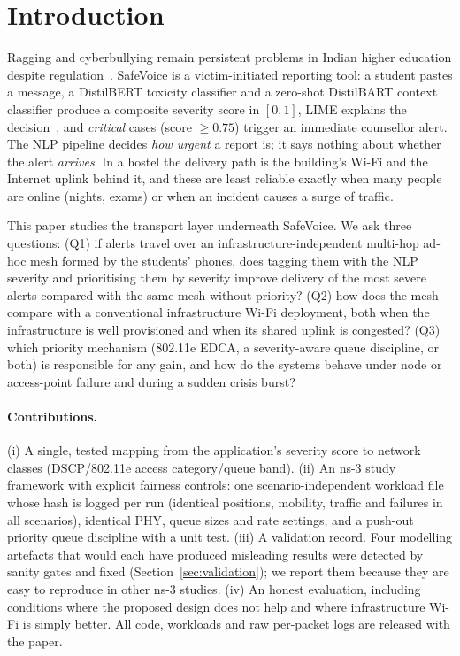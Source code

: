 \section{Introduction}
Ragging and cyberbullying remain persistent problems in Indian higher education despite regulation~\cite{ugc2009}.
SafeVoice is a victim-initiated reporting tool: a student pastes a message, a DistilBERT toxicity classifier and a zero-shot
DistilBART context classifier produce a composite severity score in $[0,1]$, LIME explains the decision~\cite{ribeiro2016,sanh2019},
and \emph{critical} cases (score $\ge 0.75$) trigger an immediate counsellor alert.
The NLP pipeline decides \emph{how urgent} a report is; it says nothing about whether the alert \emph{arrives}.
In a hostel the delivery path is the building's Wi-Fi and the Internet uplink behind it, and these are least reliable exactly when many
people are online (nights, exams) or when an incident causes a surge of traffic.

This paper studies the transport layer underneath SafeVoice. We ask three questions:
(Q1) if alerts travel over an infrastructure-independent multi-hop ad-hoc mesh formed by the students' phones, does tagging them with
the NLP severity and prioritising them by severity improve delivery of the most severe alerts compared with the same mesh without priority?
(Q2) how does the mesh compare with a conventional infrastructure Wi-Fi deployment, both when the infrastructure is well provisioned
and when its shared uplink is congested? (Q3) which priority mechanism (802.11e EDCA, a severity-aware queue discipline, or both) is responsible
for any gain, and how do the systems behave under node or access-point failure and during a sudden crisis burst?

\paragraph{Contributions.}
(i) A single, tested mapping from the application's severity score to network classes (DSCP/802.11e access category/queue band).
(ii) An ns-3 study framework with explicit fairness controls: one scenario-independent workload file whose hash is logged per run
(identical positions, mobility, traffic and failures in all scenarios), identical PHY, queue sizes and rate settings, and a push-out
priority queue discipline with a unit test.
(iii) A validation record. Four modelling artefacts that would each have produced misleading results were detected by sanity gates and fixed
(Section~\ref{sec:validation}); we report them because they are easy to reproduce in other ns-3 studies.
(iv) An honest evaluation, including conditions where the proposed design does not help and where infrastructure Wi-Fi is simply better.
All code, workloads and raw per-packet logs are released with the paper.

